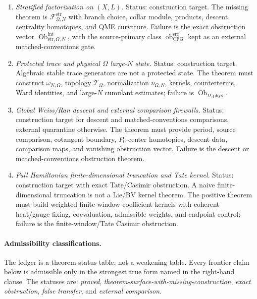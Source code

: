 \begin{enumerate}
  \item \emph{Stratified factorization on \((X,L)\).}
  Status: construction target.  The missing theorem is
  \(\mathcal F^{\mathrm{str}}_{\Omega,N}\) with branch choice, collar
  module, products, descent, centrality homotopies, and QME curvature.
  Failure is the exact obstruction vector
  \(\operatorname{Ob}^{\mathrm{int}}_{\mathrm{str},\Omega,N}\), with the
  source-primary class
  \(\operatorname{ob}^{\mathrm{src}}_{\mathrm{CFG}}\) kept as an external
  matched-conventions gate.

  \item \emph{Protected trace and physical \(\Omega\) large-\(N\) state.}
  Status: construction target.  Algebraic stable trace generators are not
  a protected state.  The theorem must construct \(\omega_{N,\Omega}\),
  topology \(\mathcal T_\Omega\), normalization \(\nu_{\Omega,N}\),
  kernels, counterterms, Ward identities, and large-\(N\) cumulant
  estimates; failure is
  \(\operatorname{Ob}_{\Omega,\mathrm{phys}}\).

  \item \emph{Global Weiss/Ran descent and external comparison firewalls.}
  Status: construction target for descent and matched-conventions
  comparisons, external quarantine otherwise.  The theorem must provide
  period, source comparison, cotangent boundary, \(P_0\)-center
  homotopies, descent data, comparison maps, and vanishing obstruction
  vector.  Failure is the descent or matched-conventions obstruction
  theorem.

  \item \emph{Full Hamiltonian finite-dimensional truncation and Tate
  kernel.}
  Status: construction target with exact Tate/Casimir obstruction.  A
  naive finite-dimensional truncation is not a Lie/BV kernel theorem.
  The positive theorem must build weighted finite-window coefficient
  kernels with coherent heat/gauge fixing, coevaluation, admissible
  weights, and endpoint control; failure is the finite-window/Tate
  Casimir obstruction.
\end{enumerate}

\medskip
\paragraph{Admissibility classifications.}
The ledger is a theorem-status table, not a weakening table.  Every
frontier claim below is admissible only in the strongest true form named
in the right-hand clause.  The statuses are:
\emph{proved}, \emph{theorem-surface-with-missing-construction},
\emph{exact obstruction}, \emph{false transfer}, and
\emph{external comparison}.

